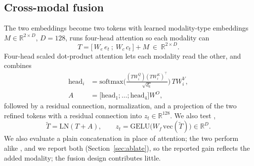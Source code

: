 \documentclass[preprint,12pt]{elsarticle}
\providecommand{\DIFaddtex}[1]{{\protect\color{blue} \sf #1}} %
\providecommand{\DIFdeltex}[1]{{\protect\color{red} \scriptsize #1}} %
\providecommand{\DIFaddbegin}{} %
\providecommand{\DIFaddend}{} %
\providecommand{\DIFdelbegin}{} %
\providecommand{\DIFdelend}{} %
\providecommand{\DIFadd}[1]{\texorpdfstring{\DIFaddtex{#1}}{#1}} %
\providecommand{\DIFdel}[1]{\texorpdfstring{\DIFdeltex{#1}}{}} %
\providecommand{\DIFscaledelfig}{0.5}
\newlength{\DIFdelgraphicswidth} %
\newlength{\DIFdelgraphicsheight} %
\providecommand{\DIFaddincludegraphics}[2][]{{\color{blue}\fbox{\DIFOincludegraphics[#1]{#2}}}} %
\providecommand{\DIFdelincludegraphics}[2][]{%
\sbox{\DIFdelgraphicsbox}{\DIFOincludegraphics[#1]{#2}}%
\settoboxwidth{\DIFdelgraphicswidth}{\DIFdelgraphicsbox} %
\settoboxtotalheight{\DIFdelgraphicsheight}{\DIFdelgraphicsbox} %
\scalebox{\DIFscaledelfig}{%
\parbox[b]{\DIFdelgraphicswidth}{\usebox{\DIFdelgraphicsbox}\\[-\baselineskip] \rule{\DIFdelgraphicswidth}{0em}}\llap{\resizebox{\DIFdelgraphicswidth}{\DIFdelgraphicsheight}{%
\setlength{\unitlength}{\DIFdelgraphicswidth}%
\begin{picture}(1,1)%
\thicklines\linethickness{2pt} %
{\color[rgb]{1,0,0}\put(0,0){\framebox(1,1){}}}%
{\color[rgb]{1,0,0}\put(0,0){\line( 1,1){1}}}%
{\color[rgb]{1,0,0}\put(0,1){\line(1,-1){1}}}%
\end{picture}%
}\hspace*{3pt}}} %
} %
\DeclareRobustCommand{\DIFaddbegin}{\DIFOaddbegin \let\includegraphics\DIFaddincludegraphics} %
\DeclareRobustCommand{\DIFaddend}{\DIFOaddend \let\includegraphics\DIFOincludegraphics} %
\DeclareRobustCommand{\DIFdelbegin}{\DIFOdelbegin \let\includegraphics\DIFdelincludegraphics} %
\DeclareRobustCommand{\DIFdelend}{\DIFOaddend \let\includegraphics\DIFOincludegraphics} %
\begin{document}
\subsection{\DIFadd{Cross-modal fusion}}
\DIFadd{The two embeddings become two tokens with }\DIFaddend learned modality-type embeddings
\DIFaddbegin \DIFadd{$M\in\mathbb{R}^{2\times D}$, $D=128$}\DIFaddend ,
\DIFdelbegin \DIFdel{runs four-head attention so each modality can }\DIFdelend \DIFaddbegin \begin{equation}
T=\big[\,W_e\,e_t\ ;\ W_c\,c_t\,\big]+M\ \in\ \mathbb{R}^{2\times D}.
\end{equation}
\DIFadd{Four-head scaled dot-product attention lets each modality }\DIFaddend read the other,
\DIFdelbegin \DIFdel{and combines }\DIFdelend \DIFaddbegin \begin{equation}
\begin{aligned}
\mathrm{head}_i&=\mathrm{softmax}\!\Big(\tfrac{(TW^Q_i)(TW^K_i)^{\!\top}}{\sqrt{d_k}}\Big)\,TW^V_i, \\
A&=\big[\mathrm{head}_1;\dots;\mathrm{head}_4\big]W^O,
\end{aligned}
\end{equation}
\DIFadd{followed by a residual connection, normalization, and a projection of }\DIFaddend the two refined tokens\DIFdelbegin \DIFdel{with a residual connection into $z_t\in\mathbb{R}^{128}$. We also test }\DIFdelend \DIFaddbegin \DIFadd{,
}\begin{equation}
\tilde T=\mathrm{LN}(T+A),\qquad z_t=\mathrm{GELU}\!\big(W_f\,\mathrm{vec}(\tilde T)\big)\in\mathbb{R}^{D}.
\end{equation}
\DIFadd{We also evaluate }\DIFaddend a plain concatenation in place of attention; the two perform alike
\DIFdelbegin \DIFdel{, and we report both}\DIFdelend \DIFaddbegin \DIFadd{(Section~\ref{sec:ablate}), so the reported gain reflects the added modality; the fusion design
contributes little}\DIFaddend .
\end{document}
